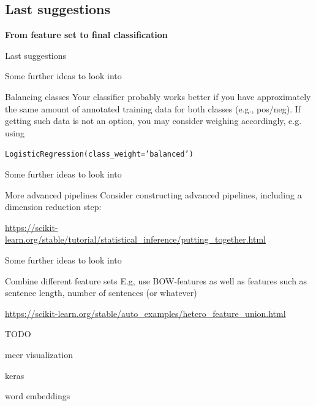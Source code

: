 \documentclass{beamer}
\begin{document}
\subsection{Last suggestions}

\begin{frame}[plain]
\textbf{From feature set to final classification}

Last suggestions
\end{frame}


\begin{frame}{Some further ideas to look into}

\begin{block}{Balancing classes}
Your classifier probably works better if you have approximately the same amount of annotated training data for both classes (e.g., pos/neg). If getting such data is not an option, you may consider weighing accordingly, e.g. using

\texttt{LogisticRegression(class\_weight='balanced')}
\end{block}

\end{frame}

\begin{frame}{Some further ideas to look into}

\begin{block}{More advanced pipelines}
Consider constructing advanced pipelines, including a dimension reduction step: 


\url{https://scikit-learn.org/stable/tutorial/statistical\_inference/putting\_together.html}
\end{block}

\end{frame}



\begin{frame}{Some further ideas to look into}

\begin{block}{Combine different feature sets}
E.g, use BOW-features as well as features such as sentence length, number of sentences (or whatever)


\url{
https://scikit-learn.org/stable/auto\_examples/hetero\_feature\_union.html}
\end{block}

\end{frame}

\begin{frame}[plain]
\huge

TODO

meer visualization


keras

word embeddings

\end{frame}
\end{document}
